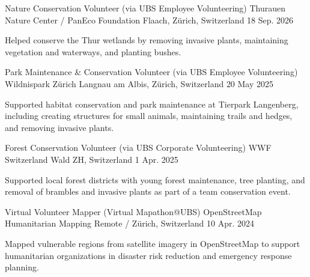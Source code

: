 

\begin{cventries}

  \cventry
    {Nature Conservation Volunteer (via UBS Employee Volunteering)} %
    {Thurauen Nature Center / PanEco Foundation} %
    {Flaach, Zürich, Switzerland} %
    {18 Sep. 2026} %
    {
      \begin{cvitems} %
        \item {Helped conserve the Thur wetlands by removing invasive plants, maintaining vegetation and waterways, and planting bushes.}
      \end{cvitems}
    }

  \cventry
    {Park Maintenance \& Conservation Volunteer (via UBS Employee Volunteering)} %
    {Wildnispark Zürich} %
    {Langnau am Albis, Zürich, Switzerland} %
    {20 May 2025} %
    {
      \begin{cvitems} %
        \item {Supported habitat conservation and park maintenance at Tierpark Langenberg, including creating structures for small animals, maintaining trails and hedges, and removing invasive plants.}
      \end{cvitems}
    }

  \cventry
    {Forest Conservation Volunteer (via UBS Corporate Volunteering)} %
    {WWF Switzerland} %
    {Wald ZH, Switzerland} %
    {1 Apr. 2025} %
    {
      \begin{cvitems} %
        \item {Supported local forest districts with young forest maintenance, tree planting, and removal of brambles and invasive plants as part of a team conservation event.}
      \end{cvitems}
    }

  \cventry
    {Virtual Volunteer Mapper (Virtual Mapathon@UBS)} %
    {OpenStreetMap Humanitarian Mapping} %
    {Remote / Zürich, Switzerland} %
    {10 Apr. 2024} %
    {
      \begin{cvitems} %
        \item {Mapped vulnerable regions from satellite imagery in OpenStreetMap to support humanitarian organizations in disaster risk reduction and emergency response planning.}
      \end{cvitems}
    }

\end{cventries}
